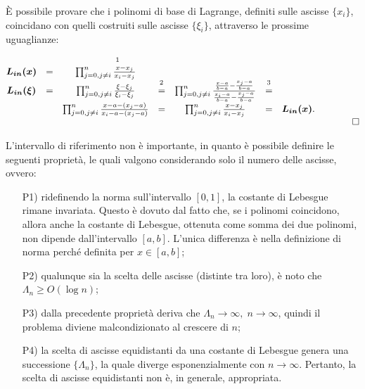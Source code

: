 È possibile provare che i polinomi di base di Lagrange, definiti sulle ascisse $\{x_i\}$, coincidano con quelli costruiti sulle ascisse $\{\xi_i\}$, attraverso le prossime uguaglianze:

\begin{equation*}
    \begin{matrix}
        \boldsymbol{L_{in}(x)} &=&\prod_{j=0, j\neq i}^n\frac{\overset{\footnotemark}{x}-x_j}{x_i-x_j}&&&&&&\\
        \boldsymbol{L_{in}(\xi)} &=& \prod_{j=0,j\neq i}^n\frac{\xi-\xi_j}{\xi_i-\xi_j}&\overset{\footnotemark}{=}&\prod_{j=0, j\neq i}^n\frac{\frac{x-a}{b-a}-\frac{x_j-a}{b-a}}{\frac{x_i-a}{b-a}-\frac{x_j-a}{b-a}}&\overset{\footnotemark}{=}&\\
        &&\prod_{j=0,j\neq i}^n\frac{x-a-(x_j-a)}{x_i-a-(x_j-a)}&=&\prod_{j=0,j\neq i}^n\frac{x-x_j}{x_i-x_j}&=&\boldsymbol{L_{in}(x)}.\\
        &&&&&&&&\qed
    \end{matrix}
\end{equation*}

\addtocounter{footnote}{-2}



L'intervallo di riferimento non è importante, in quanto è possibile definire le seguenti proprietà, le quali valgono considerando solo il numero delle ascisse, ovvero:

\begin{itemize}
    \item [P1)] ridefinendo la norma sull'intervallo $[0,1]$, la costante di Lebesgue rimane invariata. Questo è dovuto dal fatto che, se i polinomi coincidono, allora anche la costante di Lebesgue, ottenuta come somma dei due polinomi, non dipende dall'intervallo $[a,b]$. L'unica differenza è nella definizione di norma perché definita per $x\in[a,b]$;
    \item [P2)] qualunque sia la scelta delle ascisse (distinte tra loro), è noto che $\Lambda_n\geq O(\log n)$;
    \item[P3)] dalla precedente proprietà deriva che $\Lambda_n\rightarrow\infty,\; n\rightarrow\infty$, quindi il problema diviene malcondizionato al crescere di $n$;
    \item[P4)] la scelta di ascisse equidistanti da una costante di Lebesgue genera una successione $\{\Lambda_n\}$, la quale diverge esponenzialmente con $n\rightarrow\infty$. Pertanto, la scelta di ascisse equidistanti non è, in generale, appropriata.
\end{itemize}

